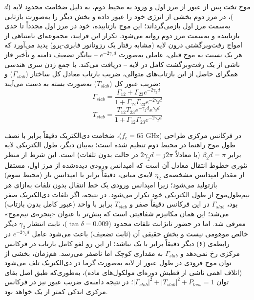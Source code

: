\documentclass{article}
\begin{document}
	موج تخت پس از عبور از مرز اول و ورود به محیط دوم، به دلیل ضخامت محدود لایه ($d$)، در مرز دوم بخشی از انرژی خود را عبور داده و بخش دیگر را به‌صورت بازتابی به‌سمت مرز اول بازمی‌گرداند؛ این موج بازتابیده، خود در مرز اول مجدداً تا حدی بازتابیده و به‌سمت مرز دوم روانه می‌شود. تکرار این فرایند، مجموعه‌ای نامتناهی از امواج رفت‌وبرگشتی درون لایه (مشابه رفتار یک رزوناتور فابری-پرو) پدید می‌آورد که هر یک نسبت به موج قبلی، عاملی به‌صورت $e^{-2\gamma_2 d}$ -- بیانگر تضعیف دامنه و تأخیر فاز ناشی از یک رفت‌وبرگشت کامل در لایه -- دریافت می‌کند. با جمع زدن سری هندسی همگرای حاصل از این بازتاب‌های متوالی، ضریب بازتاب معادل کل ساختار ($\Gamma_{slab}$) و ضریب عبور کل ($T_{slab}$) به‌صورت بسته به دست می‌آیند:
	\begin{equation}
		\Gamma_{slab} = \frac{\Gamma_{12} + \Gamma_{23}e^{-2\gamma_2 d}}{1 + \Gamma_{12}\Gamma_{23}e^{-2\gamma_2 d}}
	\end{equation}
	\begin{equation}
		T_{slab} = \frac{T_{12}T_{23}e^{-\gamma_2 d}e^{\gamma_3 d}}{1 + \Gamma_{12}\Gamma_{23}e^{-2\gamma_2 d}}
	\end{equation}
	
	در فرکانس مرکزی طراحی ($f_c = 65 \text{ GHz}$)، ضخامت دی‌الکتریک دقیقاً برابر با نصف طول موج راهنما در محیط دوم تنظیم شده است؛ به‌بیان دیگر، طول الکتریکی لایه برابر $\beta_2 d = \pi$ (یا معادلاً $2\gamma_2 d = j2\pi$ در حالت بدون تلفات) است. این شرط از منظر تئوری خطوط انتقال معادل آن است که امپدانس ورودی دیده‌شده از مرز اول، مستقل از مقدار امپدانس مشخصه‌ی $\eta_2$ لایه‌ی میانی، دقیقاً برابر با امپدانس بار (محیط سوم) بازتولید می‌شود؛ زیرا امپدانس ورودی یک خط انتقال بدون تلفات به‌ازای هر نیم‌طول‌موج از طول الکتریکی خود تکرار می‌شود. در نتیجه، اگر تلفات دی‌الکتریک صفر بود، $\Gamma_{slab}$ در این فرکانس دقیقاً صفر و $T_{slab}$ برابر با واحد (عبور کامل بدون بازتاب) می‌شد؛ این همان مکانیزم شفافیتی است که پیش‌تر با عنوان «پنجره‌ی نیم‌موج» معرفی شد. اما در حضور تانژانت تلفات محدود ($\tan\delta=0.009$)، ثابت انتشار $\gamma_2$ دیگر خالص موهومی نیست و بخش حقیقی آن (ثابت تضعیف) باعث می‌شود عامل $e^{-2\gamma_2 d}$ در رابطه‌ی (۶) دیگر دقیقاً برابر با یک نباشد؛ از این رو لغو کامل بازتاب در فرکانس مرکزی رخ نمی‌دهد و $\Gamma_{slab}$ به مقداری کوچک اما ناصفر می‌رسد. هم‌زمان، بخشی از توان موج فرودی در طول عبور از لایه به‌صورت گرما در دی‌الکتریک تلف می‌شود (اتلاف اهمی ناشی از قطبش دوره‌ای مولکول‌های ماده)، به‌طوری‌که طبق اصل بقای توان $|\Gamma_{slab}|^2 + |T_{slab}|^2 + P_{loss} = 1$؛ در نتیجه دامنه‌ی ضریب عبور نیز در فرکانس مرکزی اندکی کمتر از یک خواهد بود.
	
\end{document}
